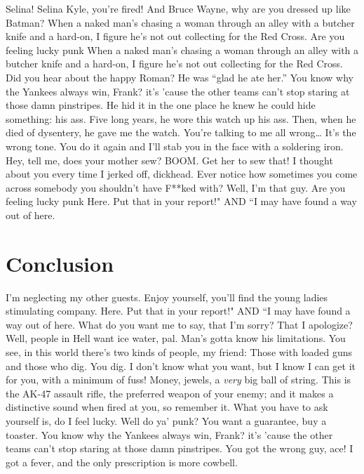 Selina! Selina Kyle, you're fired! And Bruce Wayne, why are you dressed
up like Batman? When a naked man's chasing a woman through an alley with
a butcher knife and a hard-on, I figure he's not out collecting for the
Red Cross. Are you feeling lucky punk When a naked man's chasing a woman
through an alley with a butcher knife and a hard-on, I figure he's not
out collecting for the Red Cross. Did you hear about the happy Roman? He
was ``glad he ate her.'' You know why the Yankees always win, Frank?
it's 'cause the other teams can't stop staring at those damn pinstripes.
He hid it in the one place he knew he could hide something: his ass.
Five long years, he wore this watch up his ass. Then, when he died of
dysentery, he gave me the watch. You're talking to me all wrong\ldots{}
It's the wrong tone. You do it again and I'll stab you in the face with
a soldering iron. Hey, tell me, does your mother sew? BOOM. Get her to
sew that! I thought about you every time I jerked off, dickhead. Ever
notice how sometimes you come across somebody you shouldn't have F**ked
with? Well, I'm that guy. Are you feeling lucky punk Here. Put that in
your report!" AND ``I may have found a way out of here.

\chapter{Conclusion}\label{conclusion}

I'm neglecting my other guests. Enjoy yourself, you'll find the young
ladies stimulating company. Here. Put that in your report!" AND ``I may
have found a way out of here. What do you want me to say, that I'm
sorry? That I apologize? Well, people in Hell want ice water, pal. Man's
gotta know his limitations. You see, in this world there's two kinds of
people, my friend: Those with loaded guns and those who dig. You dig. I
don't know what you want, but I know I can get it for you, with a
minimum of fuss! Money, jewels, a \emph{very} big ball of string. This
is the AK-47 assault rifle, the preferred weapon of your enemy; and it
makes a distinctive sound when fired at you, so remember it. What you
have to ask yourself is, do I feel lucky. Well do ya' punk? You want a
guarantee, buy a toaster. You know why the Yankees always win, Frank?
it's 'cause the other teams can't stop staring at those damn pinstripes.
You got the wrong guy, ace! I got a fever, and the only prescription is
more cowbell.
